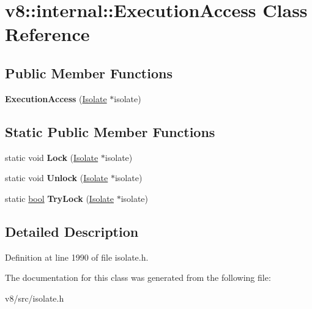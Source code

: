 \hypertarget{classv8_1_1internal_1_1ExecutionAccess}{}\section{v8\+:\+:internal\+:\+:Execution\+Access Class Reference}
\label{classv8_1_1internal_1_1ExecutionAccess}
\subsection*{Public Member Functions}
\begin{DoxyCompactItemize}
\item 
\mbox{\label{classv8_1_1internal_1_1ExecutionAccess_ae7aa025b4fc379165c1bc8218b8ec7bb}} 
{\bfseries Execution\+Access} (\mbox{\hyperlink{classv8_1_1internal_1_1Isolate}{Isolate}} $\ast$isolate)
\end{DoxyCompactItemize}
\subsection*{Static Public Member Functions}
\begin{DoxyCompactItemize}
\item 
\mbox{\label{classv8_1_1internal_1_1ExecutionAccess_a3decec5284de3a9c1f919f55db590905}} 
static void {\bfseries Lock} (\mbox{\hyperlink{classv8_1_1internal_1_1Isolate}{Isolate}} $\ast$isolate)
\item 
\mbox{\label{classv8_1_1internal_1_1ExecutionAccess_aef6dcb7a13d8b7440f7d28896029b06b}} 
static void {\bfseries Unlock} (\mbox{\hyperlink{classv8_1_1internal_1_1Isolate}{Isolate}} $\ast$isolate)
\item 
\mbox{\label{classv8_1_1internal_1_1ExecutionAccess_a4a9fe18838704448b440efbac29fc9c9}} 
static \mbox{\hyperlink{classbool}{bool}} {\bfseries Try\+Lock} (\mbox{\hyperlink{classv8_1_1internal_1_1Isolate}{Isolate}} $\ast$isolate)
\end{DoxyCompactItemize}


\subsection{Detailed Description}


Definition at line 1990 of file isolate.\+h.



The documentation for this class was generated from the following file\+:\begin{DoxyCompactItemize}
\item 
v8/src/isolate.\+h\end{DoxyCompactItemize}
